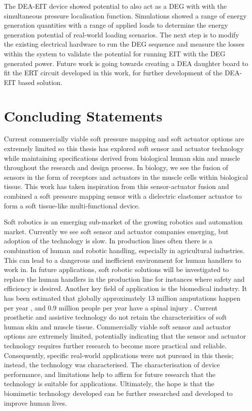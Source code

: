 The DEA-EIT device showed potential to also act as a DEG with with the simultaneous pressure localisation function. Simulations showed a range of energy generation quantities with a range of applied loads to determine the energy generation potential of real-world loading scenarios. The next step is to modify the existing electrical hardware to run the DEG sequence and measure the losses within the system to validate the potential for running EIT with the DEG generated power. Future work is going towards creating a DEA daughter board to fit the ERT circuit developed in this work, for further development of the DEA-EIT based solution.

\section{Concluding Statements}
Current commercially viable soft pressure mapping and soft actuator options are extremely limited so this thesis has explored soft sensor and actuator technology while maintaining specifications derived from biological human skin and muscle throughout the research and design process. In biology, we see the fusion of sensors in the form of receptors and actuators in the muscle cells within biological tissue. This work has taken inspiration from this sensor-actuator fusion and combined a soft pressure mapping sensor with a dielectric elastomer actuator to form a soft tissue-like multi-functional device.

Soft robotics is an emerging sub-market of the growing robotics and automation market. Currently we see soft sensor and actuator companies emerging, but adoption of the technology is slow. In production lines often there is a combination of human and robotic handling, especially in agricultural industries. This can lead to a dangerous and inefficient environment for human handlers to work in. In future applications, soft robotic solutions will be investigated to replace the human handlers in the production line for instances where safety and efficiency is desired. Another key field of application is the biomedical industry. It has been estimated that globally approximately 13 million amputations happen per year \cite{Yuan2023a}, and 0.9 million people per year have a spinal injury \cite{Ding2022}. Current prosthetic and assistive technology do not retain the characterisitics of soft human skin and muscle tissue. Commercially viable soft sensor and actuator options are extremely limited, potentially indicating that the sensor and actuator technology requires further research to become more practical and reliable. Consequently, specific real-world applications were not pursued in this thesis; instead, the technology was characterised. The characterisation of device performance, and limitations help to affirm for future research that the technology is suitable for applications. Ultimately, the hope is that the biomimetic technology developed can be further researched and developed to improve human lives.

